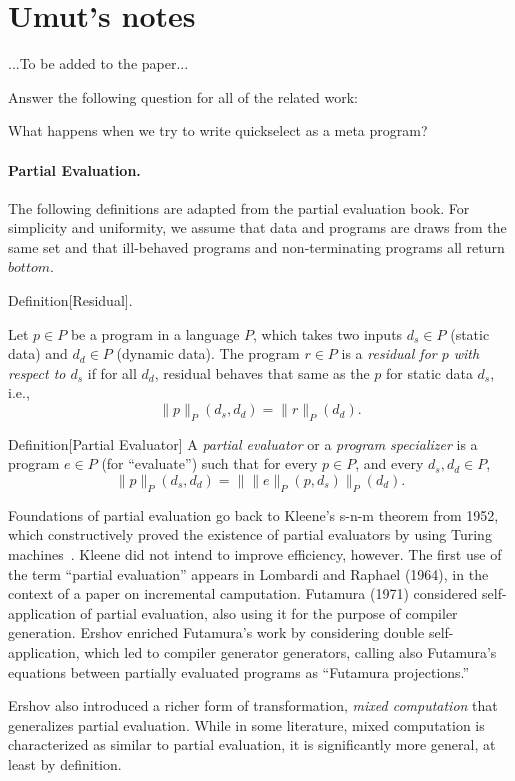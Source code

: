 
\section{Umut's notes}

...To be added to the paper...


Answer the following question for all of the related work:

What happens when we try to write quickselect as a meta program? 


\newcommand{\drun}[2]{\lVert{#2}\rVert_{#1}}
\paragraph{Partial Evaluation.}


The following definitions are adapted from the partial evaluation
book.  For simplicity and uniformity, we assume that data and programs
are draws from the same set and that ill-behaved programs and
non-terminating programs all return $bottom$.

Definition[Residual].  

Let $p \in P$ be a program in a language $P$, which takes two inputs
$d_s \in P$ (static data) and $d_d \in P$ (dynamic data).  The program
$r \in P$ is a {\em residual for $p$ with respect to $d_s$} if for all
$d_d$, residual behaves that same as the $p$ for static data $d_s$,
i.e., 
\[
\drun{P}{p} (d_s, d_d) = \drun{P}{r} (d_d).
\]


Definition[Partial Evaluator]
A {\em partial evaluator} or a {\em program specializer} is a program
$e \in P$ (for ``evaluate'') such that for every $p \in P$, and every
$d_s, d_d \in P$, 
\[
\drun{P}{p} (d_s, d_d) = \drun{P}{\drun{P}{e}(p, d_s)} (d_d).
\]

Foundations of partial evaluation go back to Kleene's s-n-m theorem
from 1952, which constructively proved the existence of partial
evaluators by using Turing machines~\cite{Kleene52}.  Kleene did not
intend to improve efficiency, however. The first use of the term
``partial evaluation'' appears in Lombardi and Raphael (1964), in the
context of a paper on incremental camputation. Futamura (1971)
considered self-application of partial evaluation, also using it for
the purpose of compiler generation.  Ershov enriched Futamura's work
by considering double self-application, which led to compiler
generator generators, calling also Futamura's equations between
partially evaluated programs as ``Futamura projections.''  

Ershov also introduced a richer form of transformation, {\em mixed
  computation} that generalizes partial evaluation.  While in some
literature, mixed computation is characterized as similar to partial
evaluation, it is significantly more general, at least by definition. 

